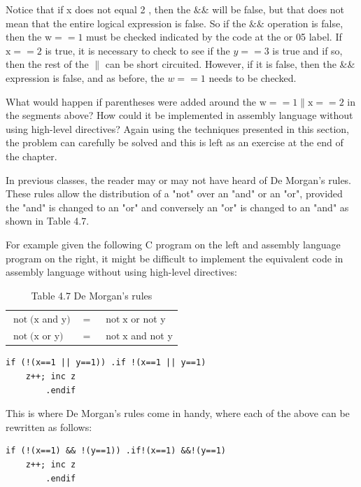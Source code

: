 \documentclass[10pt]{article}
\begin{document}
Notice that if x does not equal 2 , then the $\& \&$ will be false, but that does not mean that the entire logical expression is false. So if the $\& \&$ operation is false, then the $\mathrm{w}==1$ must be checked indicated by the code at the or 05 label. If $\mathrm{x}==2$ is true, it is necessary to check to see if the $y==3$ is true and if so, then the rest of the $\|$ can be short circuited. However, if it is false, then the \&\& expression is false, and as before, the $w==1$ needs to be checked.

What would happen if parentheses were added around the $\mathrm{w}==1 \| \mathrm{x}==2$ in the segments above? How could it be implemented in assembly language without using high-level directives? Again using the techniques presented in this section, the problem can carefully be solved and this is left as an exercise at the end of the chapter.

In previous classes, the reader may or may not have heard of De Morgan's rules. These rules allow the distribution of a "not" over an "and" or an "or", provided the "and" is changed to an "or" and conversely an "or" is changed to an "and" as shown in Table 4.7.

For example given the following C program on the left and assembly language program on the right, it might be difficult to implement the equivalent code in assembly language without using high-level directives:

\begin{table}[h]
\begin{center}
\captionsetup{labelformat=empty}
\caption{Table 4.7 De Morgan's rules}
\begin{tabular}{ll|l}
$\operatorname{not}(\mathrm{x}$ and y$)$ & $=$ & $\operatorname{not} \mathrm{x}$ or not y \\
$\operatorname{not}(\mathrm{x}$ or y$)$ & $=$ & $\operatorname{not} \mathrm{x}$ and not y \\
\end{tabular}
\end{center}
\end{table}

\begin{verbatim}
if (!(x==1 || y==1)) .if !(x==1 || y==1)
    z++; inc z
        .endif
\end{verbatim}

This is where De Morgan's rules come in handy, where each of the above can be rewritten as follows:

\begin{verbatim}
if (!(x==1) && !(y==1)) .if!(x==1) &&!(y==1)
    z++; inc z
        .endif
\end{verbatim}
\end{document}
